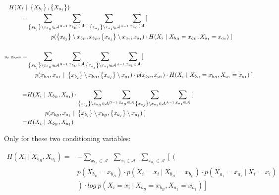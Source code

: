 \begin{align}
\label{eq:Markov_CondAB_H_reducing}
	H(X_{i} \ | & \ \left\{X_{b_{j}}\right\} , \left\{X_{a_{j}}\right\})  \nonumber \\
	= & \sum_{  \left\{x_{b_{j}}\right\} \setminus x_{b_{B}} \in \mathcal{A}^{B-1}  }\sum_{  x_{b_{B}} \in \mathcal{A}} \ \ \sum_{  \left\{x_{a_{j}}\right\} \setminus x_{a_{1}} \in \mathcal{A}^{A-1} }\sum_{x_{a_{1}} \in \mathcal{A} } \left[ \right. \nonumber \\
	& \ \ \ \ \ \ \ \ \ \ \ \ p(\left\{x_{b_{j}}\right\} \setminus x_{b_{B}}, x_{b_{B}} , \left\{x_{a_{j}}\right\} \setminus x_{a_{1}}, x_{a_{1}}) \cdot H( X_{i} \ | \ X_{b_{B}} = x_{b_{B}} , X_{a_{1}} = x_{a_{1}})   \left. \right]   \nonumber \\
	\nonumber \\
	\text{\tiny{By Bayes}} = & \sum_{  \left\{x_{b_{j}}\right\} \setminus x_{b_{B}} \in \mathcal{A}^{B-1}  }\sum_{  x_{b_{B}} \in \mathcal{A}} \sum_{  \left\{x_{a_{j}}\right\} \setminus x_{a_{1}} \in \mathcal{A}^{A-1} }\sum_{x_{a_{1}} \in \mathcal{A} } \left[ \right. \nonumber \\
	& \ \ \ \  p(x_{b_{B}} , x_{a_{1}} \ | \ \left\{x_{b_{j}}\right\} \setminus x_{b_{B}} , \left\{x_{a_{j}}\right\} \setminus x_{a_{1}}) \cdot p(x_{b_{B}} , x_{a_{1}})  \cdot H( X_{i} \ | \ X_{b_{B}} = x_{b_{B}} , X_{a_{1}} = x_{a_{1}})     \left. \right]  \nonumber \\
	\nonumber \\
	= & H( X_{i} \ | \ X_{b_{B}}, X_{a_{1}} ) \cdot \sum_{  \left\{x_{b_{j}}\right\} \setminus x_{b_{B}} \in \mathcal{A}^{B-1}  }\sum_{  x_{b_{B}} \in \mathcal{A}} \sum_{  \left\{x_{a_{j}}\right\} \setminus x_{a_{1}} \in \mathcal{A}^{A-1} }\sum_{x_{a_{1}} \in \mathcal{A} } \left[ \right. \nonumber \\
	&  \ \ \ \ \ \ \ \ \ p(x_{b_{B}} , x_{a_{1}} \ | \ \left\{x_{b_{j}}\right\} \setminus x_{b_{B}} , \left\{x_{a_{j}}\right\} \setminus x_{a_{1}})  \left. \right]   \nonumber \\	
		= & H( X_{i} \ | \ X_{b_{B}}, X_{a_{1}} ) 
\end{align}
\normalsize

Only for these two conditioning variables:

\begin{align}
\label{eq:Markov_CondAB_H_Reduced_FullNom_FORTWO}
	H(X_{i} \ | \ X_{b_{B}} , X_{a_{1}}) = & - \sum_{  x_{b_{B}} \in \mathcal{A}  }{ \ \ \sum_{ x_{i} \in \mathcal{A} }{ \ \ \sum_{  x_{a_{1}} \in \mathcal{A}      }{ }}} \left[ \left(   \right. \right.  \nonumber \\
			&	p(X_{b_{B}} = x_{b_{B}}) \cdot p(X_{i} = x_{i} \ | \ X_{b_{B}} = x_{b_{B}}) \cdot p(X_{a_{1}} = x_{a_{1}} \ | \ X_{i} = x_{i})     \nonumber \\
  		& \left. \left.	\right) \cdot log \ p(X_{i} = x_{i} \ | \ X_{b_{B}} = x_{b_{B}} , X_{a_{1}} = x_{a_{1}})  \right]  
\end{align}


